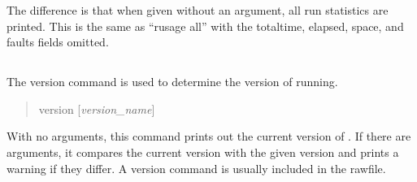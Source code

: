 The difference is that when given without an argument, all run statistics
are printed.  This is the same as ``{\vt rusage all}'' with the {\vt
totaltime}, {\vt elapsed}, {\vt space}, and {\vt faults} fields
omitted.


\subsection{}


The {\cb version} command is used to determine the version of {\WRspice}
running.
\begin{quote}\vt
version [{\it version\_name\/}]
\end{quote}
With no arguments, this command prints out the current version of
{\WRspice}.  If there are arguments, it compares the current version
with the given version and prints a warning if they differ.  A version
command is usually included in the rawfile.



